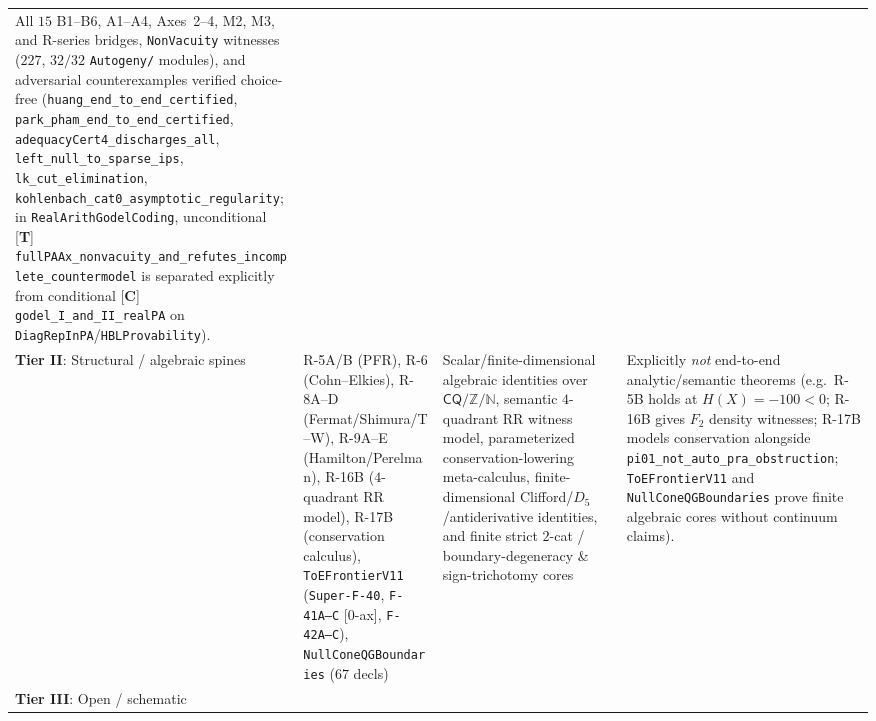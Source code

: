 \documentclass[11pt]{article}
\theoremstyle{plain}
\theoremstyle{definition}
\begin{document}
\begin{center}
\begin{tabular}{@{} >{\raggedright\arraybackslash}p{2.2cm} >{\raggedright\arraybackslash}p{4.0cm} >{\raggedright\arraybackslash}p{3.9cm} >{\raggedright\arraybackslash}p{3.9cm} @{}}
All $15$ B1--B6, A1--A4, Axes~2--4, M2, M3, and R-series bridges, \texttt{NonVacuity} witnesses ($227$, $32/32$ \texttt{Autogeny/} modules), and adversarial counterexamples verified choice-free (\texttt{huang\_\allowbreak end\_\allowbreak to\_\allowbreak end\_\allowbreak certified}, \texttt{park\_\allowbreak pham\_\allowbreak end\_\allowbreak to\_\allowbreak end\_\allowbreak certified}, \texttt{adequacyCert4\_\allowbreak discharges\_\allowbreak all}, \texttt{left\_\allowbreak null\_\allowbreak to\_\allowbreak sparse\_\allowbreak ips}, \texttt{lk\_\allowbreak cut\_\allowbreak elimination}, \texttt{kohlenbach\_\allowbreak cat0\_\allowbreak asymptotic\_\allowbreak regularity}; in \texttt{RealArith\allowbreak GodelCoding}, unconditional \textup{[\textbf{T}]} \texttt{fullPAAx\_\allowbreak nonvacuity\_\allowbreak and\_\allowbreak refutes\_\allowbreak incomplete\_\allowbreak countermodel} is separated explicitly from conditional \textup{[\textbf{C}]} \texttt{godel\_\allowbreak I\_\allowbreak and\_\allowbreak II\_\allowbreak realPA} on \texttt{DiagRepInPA}/\allowbreak\texttt{HBLProvability}). \\ \addlinespace[3pt]
\textbf{Tier II}: Structural / algebraic spines &
R-5A/B (PFR), R-6 (Cohn--Elkies), R-8A--D (Fermat/Shimura/T--W), R-9A--E (Hamilton/Perelman), R-16B ($4$-quadrant RR model), R-17B (conservation calculus), \texttt{ToEFrontierV11} (\texttt{Super-F-40}, \texttt{F-41A--C} [$0$-ax], \texttt{F-42A--C}), \texttt{NullCone\allowbreak QGBoundaries} ($67$ decls) &
Scalar/finite-dimensional algebraic identities over $\mathsf{CQ}/\mathbb{Z}/\mathbb{N}$, semantic $4$-quadrant RR witness model, parameterized conservation-lowering meta-calculus, finite-dimensional Clifford/$D_5$/antiderivative identities, and finite strict $2$-cat / boundary-degeneracy \& sign-trichotomy cores &
Explicitly \emph{not} end-to-end analytic/semantic theorems (e.g.\ R-5B holds at $H(X)=-100 < 0$; R-16B gives $F_2$ density witnesses; R-17B models conservation alongside \texttt{pi01\_\allowbreak not\_\allowbreak auto\_\allowbreak pra\_\allowbreak obstruction}; \texttt{ToEFrontierV11} and \texttt{NullCone\allowbreak QGBoundaries} prove finite algebraic cores without continuum claims). \\ \addlinespace[3pt]
\textbf{Tier III}: Open / schematic &

\end{tabular}
\end{center}
\end{document}
